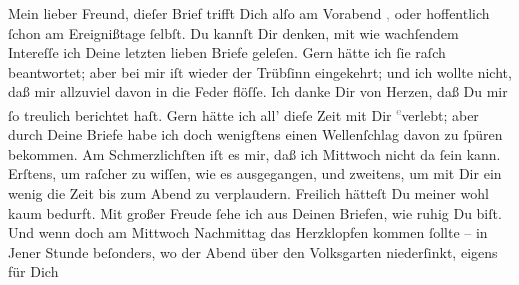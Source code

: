 \pstart\center{}Mein lieber Freund,\pend\vspace{0.5em}
\pstart
           dieſer Brief trifft Dich alſo am Vorabend{ }\label{K_L02750-1v}\label{K_L02750-1}\textcolor{gray}{,} oder hoffentlich{ }ſchon am Ereignißtage{ }ſelbſt. Du kannſt Dir denken, mit wie wachſendem Intereſſe
               ich Deine letzten lieben Briefe geleſen. Gern hätte ich{ }ſie raſch beantwortet; aber
               bei mir iſt wieder der Trübſinn eingekehrt; und ich wollte nicht, daß mir allzuviel
               davon in die Feder flöſſe. Ich danke Dir \strikeout{\textcolor{gray}{v}} von Herzen, daß Du mir{ }ſo treulich berichtet haſt. Gern  hätte ich all’ dieſe Zeit {\pb}mit Dir \substVorne{}\textsuperscript{\textcolor{gray}{e}}\substDazwischen{}v\substHinten{}erlebt; aber durch Deine Briefe habe ich doch wenigſtens einen Wellenſchlag
               davon zu{ }ſpüren bekommen. Am \strikeout{\textcolor{gray}{S}\textcolor{gray}{×}\-\textcolor{gray}{×}\-\textcolor{gray}{×}\-\textcolor{gray}{×}\-\textcolor{gray}{×}\textcolor{gray}{ſten}} Schmerzlichſten iſt es mir, daß ich Mittwoch
               nicht da{ }ſein kann. Erſtens, um raſcher zu wiſſen, wie es ausgegangen, und zweitens,
               um  mit Dir ein wenig die Zeit bis zum Abend zu verplaudern. Freilich
               hätteſt Du meiner wohl kaum bedurft. Mit großer Freude{ }ſehe ich aus Deinen Briefen,
               wie ruhig Du biſt. Und wenn doch am Mittwoch{ }Nachmittag das Herzklopfen kommen{ }ſollte – in Jener Stunde beſonders, wo
               der Abend über den {\pb}\strikeout{\textcolor{gray}{×}\-\textcolor{gray}{×}\-\textcolor{gray}{×}\-\textcolor{gray}{×}\-\textcolor{gray}{×}\-\textcolor{gray}{×}\-\textcolor{gray}{×}}{ }Volksgarten niederſinkt, eigens für Dich
